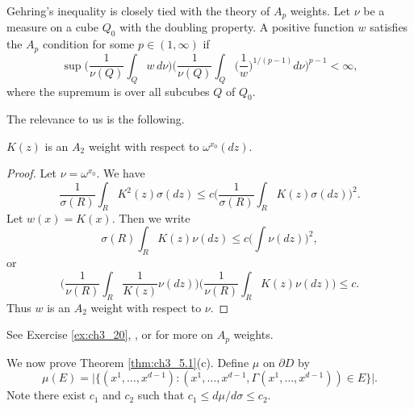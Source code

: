 Gehring's inequality is closely tied with the theory of $A_p$ weights. Let $\nu$ be a measure on a cube $Q_0$ with the doubling property. A positive function $w$ satisfies the $A_p$ condition for some $p \in (1,\infty)$ if
\[
    \sup \Big(\frac{1}{\nu(Q)} \int_Q w\,d\nu\Big)\Big(\frac{1}{\nu(Q)} \int_Q \Big(\frac{1}{w}\Big)^{1/(p-1)}d\nu\Big)^{p-1} < \infty,
\]
where the supremum is over all subcubes $Q$ of $Q_0$.

\mpagebreak

The relevance to us is the following.

\begin{theorem}\label{thm:ch3_5.10}
$K(z)$ is an $A_2$ weight with respect to $\omega^{x_0}(dz)$.
\end{theorem}

\begin{proof}
Let $\nu = \omega^{x_0}$. We have
\[
    \frac{1}{\sigma(R)} \int_R K^2(z)\sigma(dz) \leq c\Big(\frac{1}{\sigma(R)} \int_R K(z)\sigma(dz)\Big)^2.
\]
Let $w(x) = K(x)$. Then we write
\[
    \sigma(R) \int_R K(z)\nu(dz) \leq c\Big(\int \nu(dz)\Big)^2,
\]
or
\[
    \Big(\frac{1}{\nu(R)} \int_R \frac{1}{K(z)}\nu(dz)\Big)\Big(\frac{1}{\nu(R)} \int_R K(z)\nu(dz)\Big) \leq c.
\]
Thus $w$ is an $A_2$ weight with respect to $\nu$.
\end{proof}

See Exercise \ref{ex:ch3_20}, \cite{Garnett1981}, or \cite{CoifmanFefferman1974} for more on $A_p$ weights.


We now prove Theorem \ref{thm:ch3_5.1}(c). Define $\mu$ on $\partial D$ by
\begin{equation}\label{eq:ch3_5.24}
    \mu(E) = \big|\big\{(x^1,\ldots,x^{d-1}) : (x^1,\ldots,x^{d-1},\Gamma(x^1,\ldots,x^{d-1})) \in E\big\}\big|.
\end{equation}
Note there exist $c_1$ and $c_2$ such that $c_1 \leq d\mu/d\sigma \leq c_2$.

